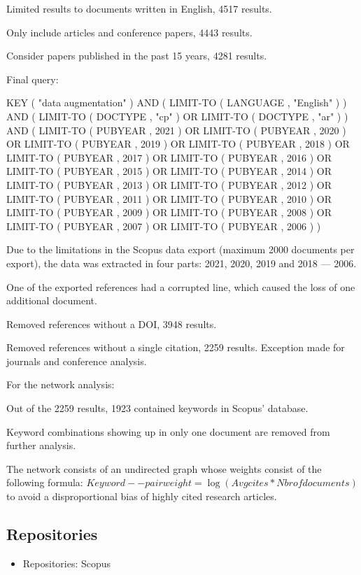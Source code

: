 \documentclass[parskip=full]{scrartcl}
\begin{document}
Limited results to documents written in English, 4517 results.

Only include articles and conference papers, 4443 results.

Consider papers published in the past 15 years, 4281 results.

Final query:

KEY ( "data augmentation" )  AND  ( LIMIT-TO ( LANGUAGE ,  "English" ) )  AND  ( LIMIT-TO ( DOCTYPE ,  "cp" )  OR  LIMIT-TO ( DOCTYPE ,  "ar" ) )  AND  ( LIMIT-TO ( PUBYEAR ,  2021 )  OR  LIMIT-TO ( PUBYEAR ,  2020 )  OR  LIMIT-TO ( PUBYEAR ,  2019 )  OR  LIMIT-TO ( PUBYEAR ,  2018 )  OR  LIMIT-TO ( PUBYEAR ,  2017 )  OR  LIMIT-TO ( PUBYEAR ,  2016 )  OR  LIMIT-TO ( PUBYEAR ,  2015 )  OR  LIMIT-TO ( PUBYEAR ,  2014 )  OR  LIMIT-TO ( PUBYEAR ,  2013 )  OR  LIMIT-TO ( PUBYEAR ,  2012 )  OR  LIMIT-TO ( PUBYEAR ,  2011 )  OR  LIMIT-TO ( PUBYEAR ,  2010 )  OR  LIMIT-TO ( PUBYEAR ,  2009 )  OR  LIMIT-TO ( PUBYEAR ,  2008 )  OR  LIMIT-TO ( PUBYEAR ,  2007 )  OR  LIMIT-TO ( PUBYEAR ,  2006 ) )  

Due to the limitations in the Scopus data export (maximum 2000 documents per
export), the data was extracted in four parts: 2021, 2020, 2019 and 2018 --- 2006.

One of the exported references had a corrupted line, which caused the loss of one
additional document.

Removed references without a DOI, 3948 results.

Removed references without a single citation, 2259 results. Exception made for
journals and conference analysis.  



For the network analysis:

Out of the 2259 results, 1923 contained keywords in Scopus' database.

Keyword combinations showing up in only one document are removed from further
analysis.

The network consists of an undirected graph whose weights consist of the
following formula: $Keyword--pair weight = \log(Avg cites * Nbr of documents)$
to avoid a disproportional bias of highly cited research articles.


\subsection{Repositories}

\begin{itemize}
    \item Repositories: Scopus
\end{itemize}
\end{document}
